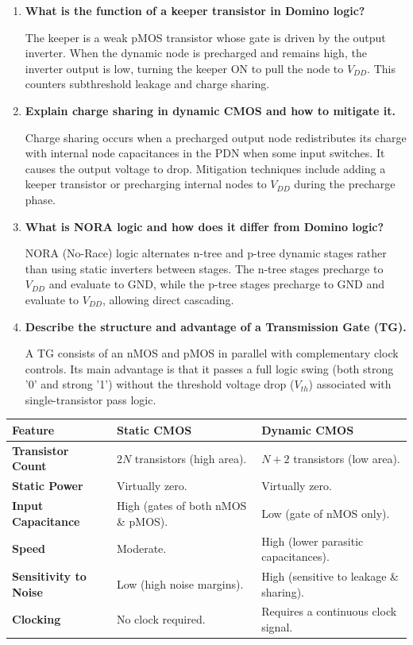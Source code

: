\documentclass[12pt,a4paper]{article}
\newcommand{\Q}[1]{\textbf{#1}\par\noindent\ignorespaces}
\renewcommand{\arraystretch}{1.45}
\begin{document}
\begin{tcolorbox}[exambox, title={\textbf{Frequently Asked / Viva Questions}}]
\begin{enumerate}[topsep=0pt, label=\textbf{Q\arabic*.}, itemsep=5pt]
  \item \Q{What is the function of a keeper transistor in Domino logic?}
    The keeper is a weak pMOS transistor whose gate is driven by the output inverter. When the dynamic node is precharged and remains high, the inverter output is low, turning the keeper ON to pull the node to $V_{DD}$. This counters subthreshold leakage and charge sharing.
  \item \Q{Explain charge sharing in dynamic CMOS and how to mitigate it.}
    Charge sharing occurs when a precharged output node redistributes its charge with internal node capacitances in the PDN when some input switches. It causes the output voltage to drop. Mitigation techniques include adding a keeper transistor or precharging internal nodes to $V_{DD}$ during the precharge phase.
  \item \Q{What is NORA logic and how does it differ from Domino logic?}
    NORA (No-Race) logic alternates n-tree and p-tree dynamic stages rather than using static inverters between stages. The n-tree stages precharge to $V_{DD}$ and evaluate to GND, while the p-tree stages precharge to GND and evaluate to $V_{DD}$, allowing direct cascading.
  \item \Q{Describe the structure and advantage of a Transmission Gate (TG).}
    A TG consists of an nMOS and pMOS in parallel with complementary clock controls. Its main advantage is that it passes a full logic swing (both strong '0' and strong '1') without the threshold voltage drop ($V_{th}$) associated with single-transistor pass logic.
\end{enumerate}
\end{tcolorbox}

\begin{tcolorbox}[tikzbox, title={Static CMOS vs. Dynamic CMOS Logic}]
\renewcommand{\arraystretch}{1.4}
\par\noindent
\begin{tabularx}{\linewidth}{|B{3.2cm}|Y|Y|}
\hline
\textbf{Feature} & \textbf{\color{myred}Static CMOS} & \textbf{\color{myteal}Dynamic CMOS} \\
\hline
\textbf{Transistor Count} & $2N$ transistors (high area). & $N + 2$ transistors (low area). \\
\hline
\textbf{Static Power} & Virtually zero. & Virtually zero. \\
\hline
\textbf{Input Capacitance} & High (gates of both nMOS \& pMOS). & Low (gate of nMOS only). \\
\hline
\textbf{Speed} & Moderate. & High (lower parasitic capacitances). \\
\hline
\textbf{Sensitivity to Noise} & Low (high noise margins). & High (sensitive to leakage \& sharing). \\
\hline
\textbf{Clocking} & No clock required. & Requires a continuous clock signal. \\
\hline
\end{tabularx}
\end{tcolorbox}
\end{document}
